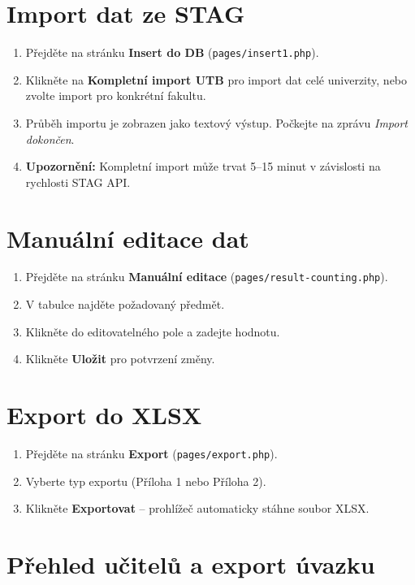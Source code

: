 \documentclass[12pt,a4paper]{report}
\begin{document}
\section{Import dat ze STAG}

\begin{enumerate}
  \item Přejděte na stránku \textbf{Insert do DB} (\texttt{pages/insert1.php}).
  \item Klikněte na \textbf{Kompletní import UTB} pro import dat celé univerzity, nebo zvolte import pro konkrétní fakultu.
  \item Průběh importu je zobrazen jako textový výstup. Počkejte na zprávu \textit{Import dokončen}.
  \item \textbf{Upozornění:} Kompletní import může trvat 5--15 minut v závislosti na rychlosti STAG API.
\end{enumerate}

\section{Manuální editace dat}

\begin{enumerate}
  \item Přejděte na stránku \textbf{Manuální editace} (\texttt{pages/result-counting.php}).
  \item V tabulce najděte požadovaný předmět.
  \item Klikněte do editovatelného pole a zadejte hodnotu.
  \item Klikněte \textbf{Uložit} pro potvrzení změny.
\end{enumerate}

\section{Export do XLSX}

\begin{enumerate}
  \item Přejděte na stránku \textbf{Export} (\texttt{pages/export.php}).
  \item Vyberte typ exportu (Příloha 1 nebo Příloha 2).
  \item Klikněte \textbf{Exportovat} -- prohlížeč automaticky stáhne soubor XLSX.
\end{enumerate}

\section{Přehled učitelů a export úvazku}
\end{document}
